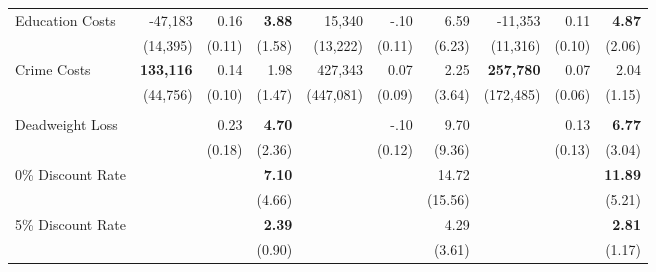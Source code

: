 \begin{tabular}{l r r r r r r r r r}
Education Costs	&	-47,183	&	0.16	&	\textbf{3.88}	&	15,340	&	-.10	&	6.59	&	-11,353	&	0.11	&	\textbf{4.87}	\\
	&	(14,395)	&	(0.11)	&	(1.58)	&	(13,222)	&	(0.11)	&	(6.23)	&	(11,316)	&	(0.10)	&	(2.06)	\\
Crime Costs	&	\textbf{133,116}	&	0.14	&	1.98	&	427,343	&	0.07	&	2.25	&	\textbf{257,780}	&	0.07	&	2.04	\\
	&	(44,756)	&	(0.10)	&	(1.47)	&	(447,081)	&	(0.09)	&	(3.64)	&	(172,485)	&	(0.06)	&	(1.15)	\\ \\
Deadweight Loss	&		&	0.23	&	\textbf{4.70}	&		&	-.10	&	9.70	&		&	0.13	&	\textbf{6.77}	\\
	&		&	(0.18)	&	(2.36)	&		&	(0.12)	&	(9.36)	&		&	(0.13)	&	(3.04)	\\
0\% Discount Rate	&		&		&	\textbf{7.10}	&		&		&	14.72	&		&		&	\textbf{11.89}	\\
	&		&		&	(4.66)	&		&		&	(15.56)	&		&		&	(5.21)	\\
5\% Discount Rate	&		&		&	\textbf{2.39}	&		&		&	4.29	&		&		&	\textbf{2.81}	\\
	&		&		&	(0.90)	&		&		&	(3.61)	&		&		&	(1.17)	\\
\bottomrule																			
\end{tabular}																			

